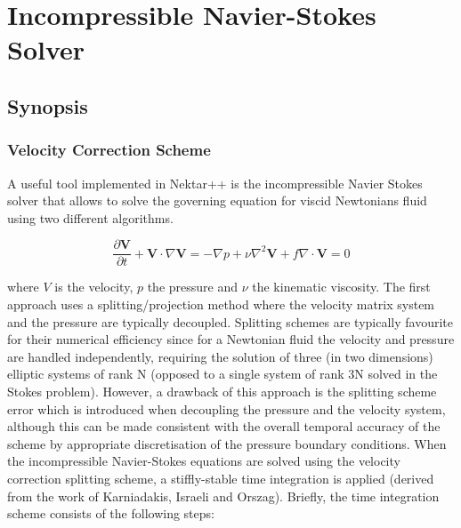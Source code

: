 \chapter{Incompressible Navier-Stokes Solver}
\label{IncNSsolver}

\section{Synopsis}
\subsection{Velocity Correction Scheme}
\label{VCSscheme}
A useful tool implemented in Nektar++ is the incompressible Navier Stokes solver that allows to solve the governing equation for viscid Newtonians fluid using two different algorithms.

\begin{subequations}
\begin{equation}
   \frac{\partial \mathbf{V}}{\partial t} + \mathbf{V} \cdot \nabla \mathbf{V} = -\nabla p + \nu \nabla^2 \mathbf{V} + f
 \end{equation}

 \begin{equation}
    \nabla \cdot \mathbf{V} = 0
    \end{equation}
 \end{subequations}

where $V$ is the velocity, $p$ the pressure and $\nu$ the kinematic viscosity. The first approach uses a splitting/projection method where the velocity matrix system and the pressure are typically decoupled. Splitting schemes are typically favourite for their numerical efficiency since for a Newtonian fluid the velocity and pressure are handled independently, requiring the solution of three (in two dimensions) elliptic systems of rank N (opposed to a single system of rank 3N solved in the Stokes problem). However, a drawback of this approach is the splitting scheme error which is introduced when decoupling the pressure and the velocity system, although this can be made consistent with the overall temporal accuracy of the scheme by appropriate discretisation of the pressure boundary conditions. When the incompressible Navier-Stokes equations are solved using the velocity correction splitting scheme, a stiffly-stable time integration is applied (derived from the work of Karniadakis, Israeli and Orszag).
 Briefly, the time integration scheme consists of the following steps:\\

